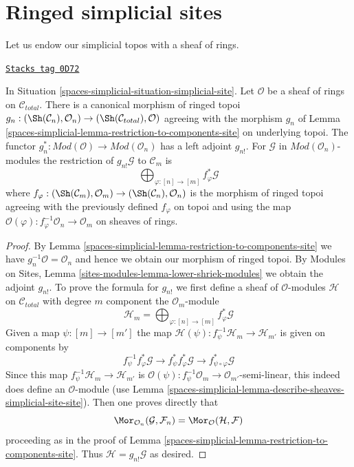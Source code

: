 \section{Ringed simplicial sites}
\label{spaces-simplicial-section-simplicial-sites-modules}
Let us endow our simplicial topos with a sheaf of rings.

\begin{lemma}
\label{spaces-simplicial-lemma-restriction-module-to-components-site}
\href{https://stacks.math.columbia.edu/tag/0D72}{\texttt{Stacks tag 0D72}}

In Situation \ref{spaces-simplicial-situation-simplicial-site}. Let $\mathcal{O}$
be a sheaf of rings on $\mathcal{C}_{total}$.
There is a canonical morphism of ringed topoi
$g_n : (\Sh(\mathcal{C}_n), \mathcal{O}_n) \to
(\Sh(\mathcal{C}_{total}), \mathcal{O})$
agreeing with the morphism $g_n$ of
Lemma \ref{spaces-simplicial-lemma-restriction-to-components-site} on underlying topoi.
The functor
$g_n^* : \textit{Mod}(\mathcal{O}) \to \textit{Mod}(\mathcal{O}_n)$
has a left adjoint $g_{n!}$.
For $\mathcal{G}$ in $\textit{Mod}(\mathcal{O}_n)$-modules the
restriction of $g_{n!}\mathcal{G}$ to $\mathcal{C}_m$ is
$$
\bigoplus\nolimits_{\varphi : [n] \to [m]} f_\varphi^*\mathcal{G}
$$
where $f_\varphi : (\Sh(\mathcal{C}_m), \mathcal{O}_m) \to
(\Sh(\mathcal{C}_n), \mathcal{O}_n)$ is the morphism of ringed topoi
agreeing with the previously defined $f_\varphi$ on topoi and
using the map
$\mathcal{O}(\varphi) : f_\varphi^{-1}\mathcal{O}_n \to \mathcal{O}_m$
on sheaves of rings.
\end{lemma}

\begin{proof}
By Lemma \ref{spaces-simplicial-lemma-restriction-to-components-site} we have
$g_n^{-1}\mathcal{O} = \mathcal{O}_n$ and hence we obtain our
morphism of ringed topoi. By Modules on Sites, Lemma
\ref{sites-modules-lemma-lower-shriek-modules}
we obtain the adjoint $g_{n!}$. To prove the formula for $g_{n!}$
we first define a sheaf of $\mathcal{O}$-modules $\mathcal{H}$
on $\mathcal{C}_{total}$ with degree $m$ component
the $\mathcal{O}_m$-module
$$
\mathcal{H}_m =
\bigoplus\nolimits_{\varphi : [n] \to [m]} f_\varphi^*\mathcal{G}
$$
Given a map $\psi : [m] \to [m']$ the map
$\mathcal{H}(\psi) : f_\psi^{-1}\mathcal{H}_m \to \mathcal{H}_{m'}$
is given on components by
$$
f_\psi^{-1} f_\varphi^*\mathcal{G} \to
f_\psi^* f_\varphi^*\mathcal{G} \to
f_{\psi \circ \varphi}^*\mathcal{G}
$$
Since this map $f_\psi^{-1}\mathcal{H}_m \to \mathcal{H}_{m'}$ is
$\mathcal{O}(\psi) : f_\psi^{-1}\mathcal{O}_m \to \mathcal{O}_{m'}$-semi-linear,
this indeed does define an $\mathcal{O}$-module
(use Lemma \ref{spaces-simplicial-lemma-describe-sheaves-simplicial-site-site}).
Then one proves directly that
$$
\Mor_{\mathcal{O}_n}(\mathcal{G}, \mathcal{F}_n) =
\Mor_{\mathcal{O}}(\mathcal{H}, \mathcal{F})
$$
proceeding as in the proof of Lemma \ref{spaces-simplicial-lemma-restriction-to-components-site}.
Thus $\mathcal{H} = g_{n!}\mathcal{G}$ as desired.
\end{proof}

